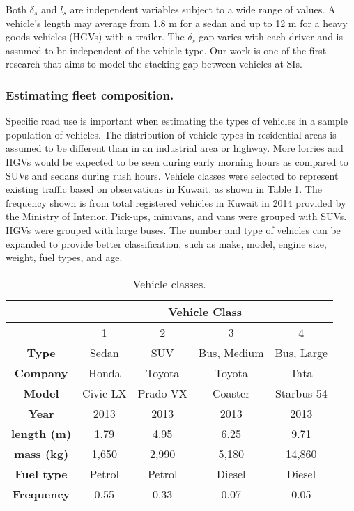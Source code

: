 Both $\delta_{s}$ and $l_{s}$ are independent variables subject to a wide range of values.  A vehicle's length may average from 1.8 m for a sedan and up to 12 m for a heavy goods vehicles (HGVs) with a trailer. The $\delta_{s}$ gap varies with each driver and is assumed to be independent of the vehicle type. Our work is one of the first research that aims to model the stacking gap between vehicles at SIs.

\subsubsection{Estimating fleet composition.}
Specific road use is important when estimating the types of vehicles in a sample population of vehicles.  The distribution of vehicle types in residential areas is assumed to be different than in an industrial area or highway. More lorries and HGVs would be expected to be seen during early morning hours as compared to SUVs and sedans during rush hours. Vehicle classes were selected to represent existing traffic based on observations in Kuwait, as shown in Table \ref{tb1:vehicletypes}. The frequency shown is from total registered vehicles in Kuwait in 2014 provided by the Ministry of Interior. Pick-ups, minivans, and vans were grouped with SUVs. HGVs were grouped with large buses. The number and type of vehicles can be expanded to provide better classification, such as make, model, engine size, weight, fuel types, and age.

\begin{table}[H]
\centering
\caption{Vehicle classes.}
\label{tb1:vehicletypes}
\begin{tabular}{@{}ccccc@{}}
\toprule
\multicolumn{1}{l}{} & \multicolumn{4}{c}{\textbf{Vehicle Class}}   \\ \midrule
\textbf{}            & 1        & 2        & 3           & 4          \\
\textbf{Type}        & Sedan    & SUV      & Bus, Medium & Bus, Large \\
\textbf{Company}     & Honda    & Toyota   & Toyota      & Tata       \\
\textbf{Model}       & Civic LX & Prado VX & Coaster     & Starbus 54 \\
\textbf{Year}        & 2013     & 2013     & 2013        & 2013       \\
\textbf{length (m)}  & 1.79     & 4.95     & 6.25        & 9.71       \\
\textbf{mass (kg)}   & 1,650    & 2,990    & 5,180       & 14,860     \\
\textbf{Fuel type}   & Petrol   & Petrol   & Diesel      & Diesel     \\
\textbf{Frequency}   & 0.55     & 0.33     & 0.07        & 0.05       \\ \bottomrule
\end{tabular}
\end{table}

